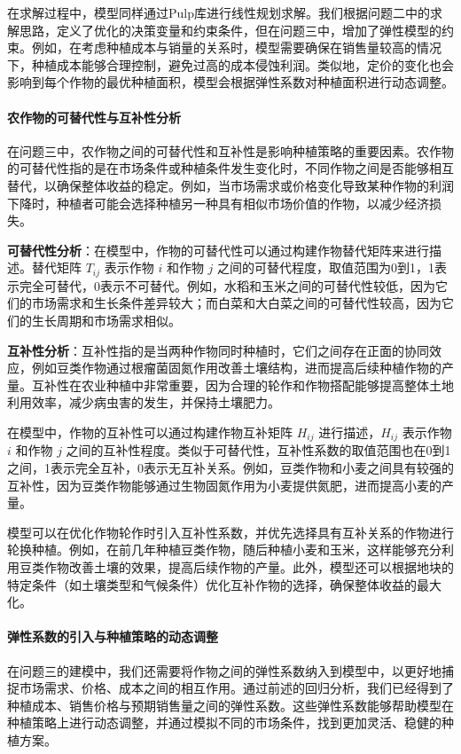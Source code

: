\documentclass[12pt,a4paper]{nmmcm}
\begin{document}
在求解过程中，模型同样通过Pulp库进行线性规划求解。我们根据问题二中的求解思路，定义了优化的决策变量和约束条件，但在问题三中，增加了弹性模型的约束。例如，在考虑种植成本与销量的关系时，模型需要确保在销售量较高的情况下，种植成本能够合理控制，避免过高的成本侵蚀利润。类似地，定价的变化也会影响到每个作物的最优种植面积，模型会根据弹性系数对种植面积进行动态调整。


\paragraph{农作物的可替代性与互补性分析}

在问题三中，农作物之间的可替代性和互补性是影响种植策略的重要因素。农作物的可替代性指的是在市场条件或种植条件发生变化时，不同作物之间是否能够相互替代，以确保整体收益的稳定。例如，当市场需求或价格变化导致某种作物的利润下降时，种植者可能会选择种植另一种具有相似市场价值的作物，以减少经济损失。

\textbf{可替代性分析}：在模型中，作物的可替代性可以通过构建作物替代矩阵来进行描述。替代矩阵 $T_{ij}$ 表示作物 $i$ 和作物 $j$ 之间的可替代程度，取值范围为0到1，1表示完全可替代，0表示不可替代。例如，水稻和玉米之间的可替代性较低，因为它们的市场需求和生长条件差异较大；而白菜和大白菜之间的可替代性较高，因为它们的生长周期和市场需求相似。

\textbf{互补性分析}：互补性指的是当两种作物同时种植时，它们之间存在正面的协同效应，例如豆类作物通过根瘤菌固氮作用改善土壤结构，进而提高后续种植作物的产量。互补性在农业种植中非常重要，因为合理的轮作和作物搭配能够提高整体土地利用效率，减少病虫害的发生，并保持土壤肥力。

在模型中，作物的互补性可以通过构建作物互补矩阵 $H_{ij}$ 进行描述，$H_{ij}$ 表示作物 $i$ 和作物 $j$ 之间的互补性程度。类似于可替代性，互补性系数的取值范围也在0到1之间，1表示完全互补，0表示无互补关系。例如，豆类作物和小麦之间具有较强的互补性，因为豆类作物能够通过生物固氮作用为小麦提供氮肥，进而提高小麦的产量。

模型可以在优化作物轮作时引入互补性系数，并优先选择具有互补关系的作物进行轮换种植。例如，在前几年种植豆类作物，随后种植小麦和玉米，这样能够充分利用豆类作物改善土壤的效果，提高后续作物的产量。此外，模型还可以根据地块的特定条件（如土壤类型和气候条件）优化互补作物的选择，确保整体收益的最大化。

\paragraph{弹性系数的引入与种植策略的动态调整}

在问题三的建模中，我们还需要将作物之间的弹性系数纳入到模型中，以更好地捕捉市场需求、价格、成本之间的相互作用。通过前述的回归分析，我们已经得到了种植成本、销售价格与预期销售量之间的弹性系数。这些弹性系数能够帮助模型在种植策略上进行动态调整，并通过模拟不同的市场条件，找到更加灵活、稳健的种植方案。
\end{document}
